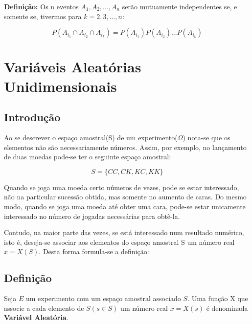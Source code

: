 \textbf{Definição:} Os n eventos $A_{1},A_{2},...,A_{n}$ serão
mutuamente independentes se, e somente se, tivermos para
$k=2,3,...,n$:

\begin{equation}\label{}
    P(A_{i_{1}} \cap A_{i_{2}} \cap A_{i_{k}})=
    P(A_{i_{1}})P(A_{i_{2}})...P(A_{i_{k}})
\end{equation}











\newpage

\section{Variáveis Aleatórias Unidimensionais}
\subsection{Introdução}

Ao se descrever o espaço amostral(S) de um experimento($\Omega$)
nota-se que os elementos não são necessariamente números. Assim,
por exemplo, no lançamento de duas moedas pode-se ter o seguinte
espaço amostral:\vskip0.3cm


\begin{equation}
    S = \{CC, CK, KC, KK\}
\end{equation}



\par Quando se joga uma moeda certo números de vezes, pode se estar
interessado, não na particular sucessão obtida, mas somente no
aumento de caras. Do mesmo modo, quando se joga uma moeda até
obter uma cara, pode-se estar unicamente interessado no número de
jogadas necessárias para obtê-la.\vskip0.3cm

\par Contudo, na maior parte das vezes, se está interessado num
resultado numérico, isto é, deseja-se associar aos elementos do
espaço amostral S um número real $x=X(S)$. Desta forma formula-se
a definição:\vskip0.3cm

\subsection{Definição}

Seja $E$ um experimento com um espaço amostral associado $S$. Uma
função X que associe a cada elemento de $S(s \in S)$ um número
real $x=X(s)$ é denominada \textbf{Variável Aleatória}.\vskip0.3cm

